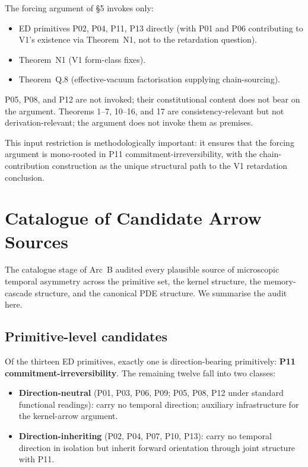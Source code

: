 \documentclass[11pt,a4paper]{article}
\begin{document}
The forcing argument of \S5 invokes only:
\begin{itemize}[leftmargin=1.5em]
  \item ED primitives P02, P04, P11, P13 directly (with P01 and P06 contributing to V1's existence via Theorem~N1, not to the retardation question).
  \item Theorem~N1 (V1 form-class fixes).
  \item Theorem~Q.8 (effective-vacuum factorisation supplying chain-sourcing).
\end{itemize}

P05, P08, and P12 are not invoked; their constitutional content does not bear on the argument. Theorems 1--7, 10--16, and 17 are consistency-relevant but not derivation-relevant; the argument does not invoke them as premises.

This input restriction is methodologically important: it ensures that the forcing argument is mono-rooted in P11 commitment-irreversibility, with the chain-contribution construction as the unique structural path to the V1 retardation conclusion.

\section{Catalogue of Candidate Arrow Sources}

The catalogue stage of Arc~B audited every plausible source of microscopic temporal asymmetry across the primitive set, the kernel structure, the memory-cascade structure, and the canonical PDE structure. We summarise the audit here.

\subsection{Primitive-level candidates}

Of the thirteen ED primitives, exactly one is direction-bearing primitively: \textbf{P11 commitment-irreversibility}. The remaining twelve fall into two classes:
\begin{itemize}[leftmargin=1.5em]
  \item \textbf{Direction-neutral} (P01, P03, P06, P09; P05, P08, P12 under standard functional readings): carry no temporal direction; auxiliary infrastructure for the kernel-arrow argument.
  \item \textbf{Direction-inheriting} (P02, P04, P07, P10, P13): carry no temporal direction in isolation but inherit forward orientation through joint structure with P11.
\end{itemize}
\end{document}
